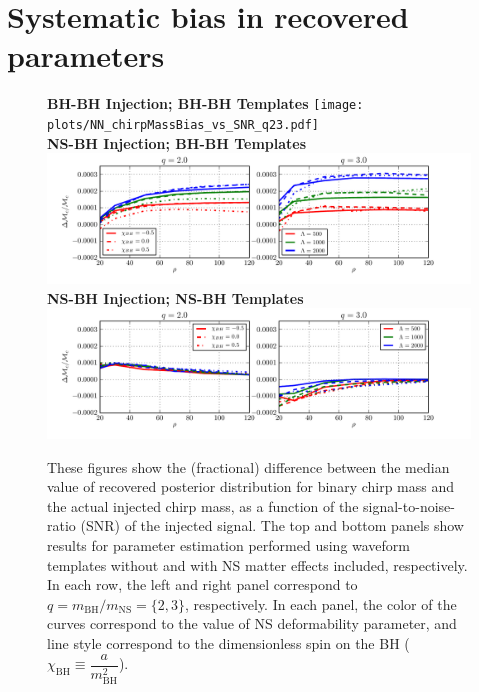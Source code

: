 \documentclass[aps,prd,amsmath,floats,floatfix, twocolumn,
superscriptaddress,nofootinbib,showpacs]{revtex4-1}
\begin{document}
\section{Systematic bias in recovered parameters}
\begin{figure}[h]
\centering 
\textbf{BH-BH Injection; BH-BH Templates}
\texttt{[image: plots/NN\_chirpMassBias\_vs\_SNR\_q23.pdf]}\\ 
\textbf{NS-BH Injection; BH-BH Templates}
\includegraphics[width=2\columnwidth]{plots/TN_chirpMassBias_vs_SNR_q23.pdf}\\ 
\textbf{NS-BH Injection; NS-BH Templates}
\includegraphics[width=2\columnwidth]{plots/TT_chirpMassBias_vs_SNR_q23.pdf}%
\caption{These figures show the (fractional) difference between the median value of
recovered posterior distribution for binary chirp mass and the actual injected chirp mass,
as a function of the signal-to-noise-ratio (SNR) of the injected signal.
The top and bottom panels show results for parameter estimation performed using
waveform templates without and with NS matter effects included, respectively.
In each row, the left and right panel correspond to 
$q=m_\mathrm{BH}/m_\mathrm{NS}=\{2,3\}$, respectively. 
In each panel, the color of the curves correspond to the value of NS deformability 
parameter, and line style correspond to the dimensionless spin on the BH 
($\chi_\mathrm{BH}\equiv \dfrac{a}{m_\mathrm{BH}^2}$).
}
\label{fig:TNT_chirpMassBias_vs_SNR_q23}
\end{figure}
% 
\end{document}
